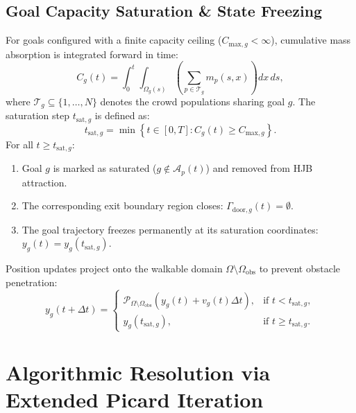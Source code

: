 \documentclass[11pt,a4paper]{article}
\begin{document}
\subsection{Goal Capacity Saturation \& State Freezing}
For goals configured with a finite capacity ceiling ($C_{\text{max}, g} < \infty$), cumulative mass absorption is integrated forward in time:
\begin{equation}
C_g(t) = \int_0^t \int_{\Omega_g(s)} \left( \sum_{p \in \mathcal{T}_g} m_p(s, x) \right) dx \, ds,
\end{equation}
where $\mathcal{T}_g \subseteq \{1, \dots, N\}$ denotes the crowd populations sharing goal $g$.
The saturation step $t_{\text{sat}, g}$ is defined as:
\begin{equation}
t_{\text{sat}, g} = \min \left\{ t \in [0, T] : C_g(t) \ge C_{\text{max}, g} \right\}.
\end{equation}
For all $t \ge t_{\text{sat}, g}$:
\begin{enumerate}
    \item Goal $g$ is marked as saturated ($g \notin \mathcal{A}_p(t)$) and removed from HJB attraction.
    \item The corresponding exit boundary region closes: $\Gamma_{\text{door}, g}(t) = \emptyset$.
    \item The goal trajectory freezes permanently at its saturation coordinates: $y_g(t) = y_g(t_{\text{sat}, g})$.
\end{enumerate}
Position updates project onto the walkable domain $\Omega \setminus \Omega_{\text{obs}}$ to prevent obstacle penetration:
\begin{equation}
y_g(t + \Delta t) = \begin{cases} 
\mathcal{P}_{\Omega \setminus \Omega_{\text{obs}}} \left( y_g(t) + v_g(t) \Delta t \right), & \text{if } t < t_{\text{sat}, g}, \\[6pt]
y_g(t_{\text{sat}, g}), & \text{if } t \ge t_{\text{sat}, g}.
\end{cases}
\end{equation}

\section{Algorithmic Resolution via Extended Picard Iteration}
\end{document}
